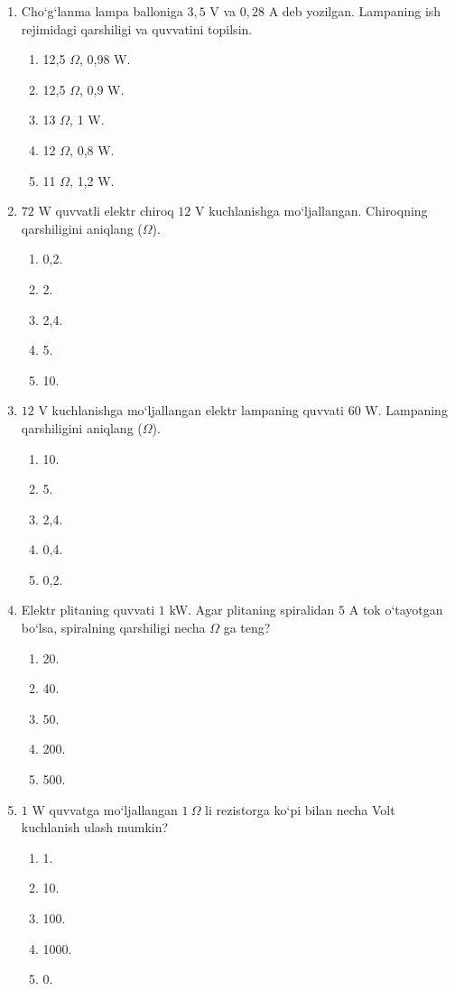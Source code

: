 \begin{enumerate}
\item Cho‘g‘lanma lampa balloniga $3,5$ V va $0,28$ A deb yozilgan. Lampaning ish rejimidagi qarshiligi va quvvatini topilsin.
\begin{enumerate}[label=\Alph*)]
\item 12,5 $\Omega$, 0,98 W.
\item 12,5 $\Omega$, 0,9 W.
\item 13 $\Omega$, 1 W.
\item 12 $\Omega$, 0,8 W.
\item 11 $\Omega$, 1,2 W.
\end{enumerate}

\item $72$ W quvvatli elektr chiroq $12$ V kuchlanishga mo‘ljallangan. Chiroqning qarshiligini aniqlang ($\Omega$).
\begin{enumerate}[label=\Alph*)]
\item 0,2.
\item 2.
\item 2,4.
\item 5.
\item 10.
\end{enumerate}

\item $12$ V kuchlanishga mo‘ljallangan elektr lampaning quvvati $60$ W. Lampaning qarshiligini aniqlang ($\Omega$).
\begin{enumerate}[label=\Alph*)]
\item 10.
\item 5.
\item 2,4.
\item 0,4.
\item 0,2.
\end{enumerate}

\item Elektr plitaning quvvati $1$ kW. Agar plitaning spiralidan $5$ A tok o‘tayotgan bo‘lsa, spiralning qarshiligi necha $\Omega$ ga teng?
\begin{enumerate}[label=\Alph*)]
\item 20.
\item 40.
\item 50.
\item 200.
\item 500.
\end{enumerate}

\item $1$ W quvvatga mo‘ljallangan $1~\Omega$ li rezistorga ko‘pi bilan necha Volt kuchlanish ulash mumkin?
\begin{enumerate}[label=\Alph*)]
\item 1.
\item 10.
\item 100.
\item 1000.
\item 0.
\end{enumerate}


\end{enumerate}
